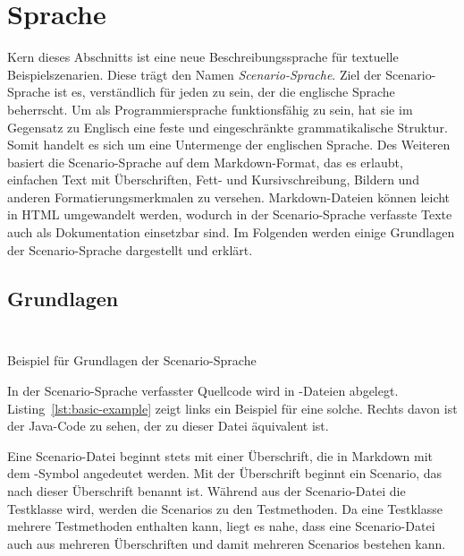 \section{Sprache}\label{sec:language}

Kern dieses Abschnitts ist eine neue Beschreibungssprache für textuelle Beispielszenarien.
Diese trägt den Namen \emph{Scenario-Sprache}.
Ziel der Scenario-Sprache ist es, verständlich für jeden zu sein, der die englische Sprache beherrscht.
Um als Programmiersprache funktionsfähig zu sein, hat sie im Gegensatz zu Englisch eine feste und eingeschränkte grammatikalische Struktur.
Somit handelt es sich um eine Untermenge der englischen Sprache.
Des Weiteren basiert die Scenario-Sprache auf dem Markdown-Format, das es erlaubt, einfachen Text mit Überschriften, Fett- und Kursivschreibung, Bildern und anderen Formatierungsmerkmalen zu versehen.
Markdown-Dateien können leicht in HTML umgewandelt werden, wodurch in der Scenario-Sprache verfasste Texte auch als Dokumentation einsetzbar sind.
Im Folgenden werden einige Grundlagen der Scenario-Sprache dargestellt und erklärt.

\subsection{Grundlagen}\label{subsec:basics}

\begin{listing}[htp]
    \begin{minipage}{0.45\textwidth}
        \centering
        \inputminted{md}{chapter/fulib-scenarios/scenarios/Basic.md}
    \end{minipage}
    \hspace{0.05\textwidth}
    \begin{minipage}{0.45\textwidth}
        \centering
        \inputminted{java}{chapter/fulib-scenarios/java/BasicTest.java}
    \end{minipage}
    \caption{Beispiel für Grundlagen der Scenario-Sprache}
    \label{lst:basic-example}
\end{listing}

In der Scenario-Sprache verfasster Quellcode wird in -Dateien abgelegt.
Listing~\ref{lst:basic-example} zeigt links ein Beispiel für eine solche.
Rechts davon ist der Java-Code zu sehen, der zu dieser Datei äquivalent ist.

Eine Scenario-Datei beginnt stets mit einer Überschrift, die in Markdown mit dem \mdcode{#}-Symbol angedeutet werden.
Mit der Überschrift beginnt ein Scenario, das nach dieser Überschrift benannt ist.
Während aus der Scenario-Datei die Testklasse wird, werden die Scenarios zu den Testmethoden.
Da eine Testklasse mehrere Testmethoden enthalten kann, liegt es nahe, dass eine Scenario-Datei auch aus mehreren Überschriften und damit mehreren Scenarios bestehen kann.

